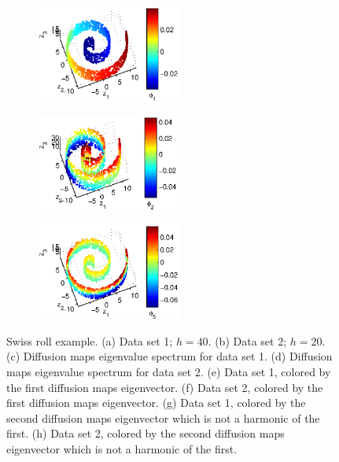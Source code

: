 \documentclass[preprint]{elsarticle}
\begin{document}
\begin{figure}[!th]
\begin{subfigure}{0.45\textwidth}
\caption{}
\end{subfigure}
\hfill
\begin{subfigure}{0.45\textwidth}
\centering
\includegraphics[height=1.25in]{swissroll2_color1}
\caption{}
\end{subfigure}
\hfill
\begin{subfigure}{0.45\textwidth}
\centering
\includegraphics[height=1.25in]{swissroll1_color2}
\caption{}
\end{subfigure}
\hfill
\begin{subfigure}{0.45\textwidth}
\centering
\includegraphics[height=1.25in]{swissroll2_color2}
\caption{}
\end{subfigure}
%
\caption{Swiss roll example. (a) Data set 1; $h= 40$. (b) Data set 2; $h = 20$. (c) Diffusion maps eigenvalue spectrum for data set 1. (d) Diffusion maps eigenvalue spectrum for data set 2. (e) Data set 1, colored by the first diffusion maps eigenvector. (f) Data set 2, colored by the first diffusion maps eigenvector. (g) Data set 1, colored by the second diffusion maps eigenvector which is not a harmonic of the first. (h) Data set 2, colored by the second diffusion maps eigenvector which is not a harmonic of the first. } 
\label{fig:swiss_rolls}	
\end{figure}
\end{document}
